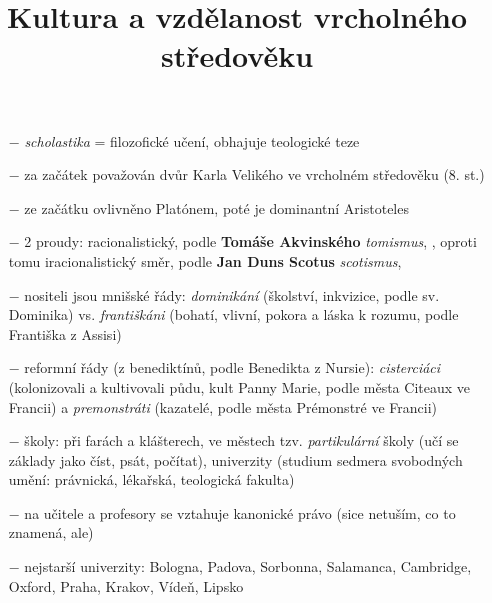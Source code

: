 \documentclass{article}
\title{\vspace{-2cm}Kultura a vzdělanost vrcholného středověku\vspace{-1.7cm}}
\date{}
\author{}
\begin{document}
\maketitle

\begin{itemize}
    \vspace{-0.5em}
    \setlength\itemsep{0.15em}
    \item[$-$] \textit{scholastika} = filozofické učení, obhajuje teologické teze
    \item[$-$] za začátek považován dvůr Karla Velikého ve vrcholném středověku (8. st.)
    \item[$-$] ze začátku ovlivněno Platónem, poté je dominantní Aristoteles
    \item[$-$] 2 proudy: racionalistický, podle \textbf{Tomáše Akvinského} \textit{tomismus}, , oproti tomu iracionalistický směr, podle \textbf{Jan Duns Scotus} \textit{scotismus}, 
    \item[$-$] nositeli jsou mnišské řády: \textit{dominikání} (školství, inkvizice, podle sv. Dominika) vs. \textit{františkáni} (bohatí, vlivní, pokora a láska k rozumu, podle Františka z Assisi)
    \item[$-$] reformní řády (z benediktínů, podle Benedikta z Nursie): \textit{cisterciáci} (kolonizovali a kultivovali půdu, kult Panny Marie, podle města Citeaux ve Francii) a \textit{premonstráti} (kazatelé, podle města Prémonstré ve Francii)
    \item[$-$] školy: při farách a klášterech, ve městech tzv. \textit{partikulární} školy (učí se základy jako číst, psát, počítat), univerzity (studium sedmera svobodných umění: právnická, lékařská, teologická fakulta)
    \item[$-$] na učitele a profesory se vztahuje kanonické právo (sice netuším, co to znamená, ale)
    \item[$-$] nejstarší univerzity: Bologna, Padova, Sorbonna, Salamanca, Cambridge, Oxford, Praha, Krakov, Vídeň, Lipsko
\end{itemize}
\end{document}
